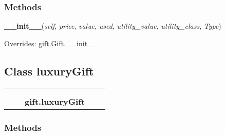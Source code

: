   \subsubsection{Methods}

    \vspace{0.5ex}

\hspace{.8\funcindent}\begin{boxedminipage}{\funcwidth}

    \raggedright \textbf{\_\_init\_\_}(\textit{self}, \textit{price}, \textit{value}, \textit{used}, \textit{utility\_value}, \textit{utility\_class}, \textit{Type})

\setlength{\parskip}{2ex}
\setlength{\parskip}{1ex}
      Overrides: gift.Gift.\_\_init\_\_

    \end{boxedminipage}



\subsection{Class luxuryGift}

    \label{gift:luxuryGift}
\begin{tabular}{cccccc}
\multicolumn{2}{r}{\settowidth{\BCL}{gift.Gift}\multirow{2}{\BCL}{gift.Gift}}
&&
  \\\cline{3-3}
  &&\multicolumn{1}{c|}{}
&&
  \\
&&\multicolumn{2}{l}{\textbf{gift.luxuryGift}}
\end{tabular}



  \subsubsection{Methods}


